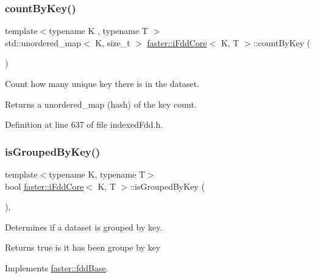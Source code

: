 \subsubsection{\texorpdfstring{count\+By\+Key()}{countByKey()}}
{\footnotesize\ttfamily template$<$typename K , typename T $>$ \\
std\+::unordered\+\_\+map$<$ K, size\+\_\+t $>$ \hyperlink{classfaster_1_1iFddCore}{faster\+::i\+Fdd\+Core}$<$ K, T $>$\+::count\+By\+Key (\begin{DoxyParamCaption}{ }\end{DoxyParamCaption})}



Count how many unique key there is in the dataset. 

\begin{DoxyReturn}{Returns}
a unordered\+\_\+map (hash) of the key count. 
\end{DoxyReturn}


Definition at line 637 of file indexed\+Fdd.\+h.

\hypertarget{classfaster_1_1iFddCore_a85b2607d1cc8f604a3965c313f16b240}{}\label{classfaster_1_1iFddCore_a85b2607d1cc8f604a3965c313f16b240} 
\subsubsection{\texorpdfstring{is\+Grouped\+By\+Key()}{isGroupedByKey()}}
{\footnotesize\ttfamily template$<$typename K, typename T$>$ \\
bool \hyperlink{classfaster_1_1iFddCore}{faster\+::i\+Fdd\+Core}$<$ K, T $>$\+::is\+Grouped\+By\+Key (\begin{DoxyParamCaption}{ }\end{DoxyParamCaption})\hspace{0.3cm}{\ttfamily [inline]}, {\ttfamily [virtual]}}



Determines if a dataset is grouped by key. 

\begin{DoxyReturn}{Returns}
true is it has been groupe by key 
\end{DoxyReturn}


Implements \hyperlink{classfaster_1_1fddBase}{faster\+::fdd\+Base}.



